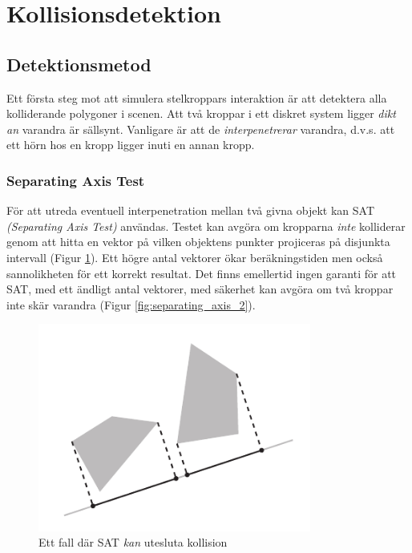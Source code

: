 \documentclass[a4paper,12pt,twopage,swedish]{article}
\begin{document}




\section{Kollisionsdetektion}

\subsection{Detektionsmetod}
Ett första steg mot att simulera stelkroppars interaktion är att detektera alla kolliderande polygoner i scenen. Att två kroppar i ett diskret system ligger \emph{dikt an} varandra är sällsynt. Vanligare är att de \emph{interpenetrerar} varandra, d.v.s. att ett hörn hos en kropp ligger inuti en annan kropp.

\subsubsection{Separating Axis Test}
För att utreda eventuell interpenetration mellan två givna objekt kan SAT\cite[s.~29]{vella08} \emph{(Separating Axis Test)} användas. Testet kan avgöra om kropparna \emph{inte} kolliderar genom att hitta en vektor på vilken objektens punkter projiceras på disjunkta intervall (Figur \ref{fig:separating_axis_1}). Ett högre antal vektorer ökar beräkningstiden men också sannolikheten för ett korrekt resultat. Det finns emellertid ingen garanti för att SAT, med ett ändligt antal vektorer, med säkerhet kan avgöra om två kroppar inte skär varandra (Figur \ref{fig:separating_axis_2}).


\begin{figure}[H]
\centering
\includegraphics[width=0.8\textwidth]{illustrations/sepaxis1.pdf}
\caption{Ett fall där SAT \emph{kan} utesluta kollision}
\label{fig:separating_axis_1}
\end{figure}
\end{document}
